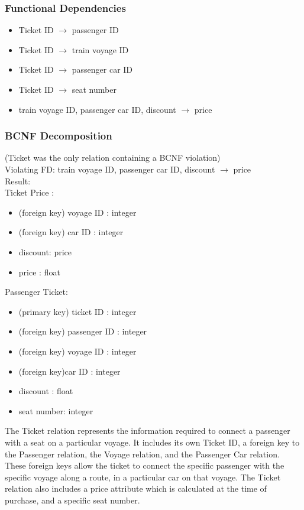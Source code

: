 \documentclass[a4paper]{article}
\begin{document}
\subsubsection*{Functional Dependencies}
\begin{itemize}
\item Ticket ID $\rightarrow$ passenger ID
\item Ticket ID $\rightarrow$ train voyage ID
\item Ticket ID $\rightarrow$ passenger car ID
\item Ticket ID $\rightarrow$ seat number
\item train voyage ID, passenger car ID, discount $\rightarrow$ price
\end{itemize}

\subsubsection*{BCNF Decomposition} 
(Ticket was the only relation containing a BCNF violation)\\
Violating FD: train voyage ID, passenger car ID, discount $\rightarrow$ price\\
Result:\\
Ticket Price :
\begin{itemize}
\item (foreign key) voyage ID : integer
\item (foreign key) car ID : integer
\item discount: price
\item price : float 
\end{itemize}

Passenger Ticket:
\begin{itemize}
\item (primary key) ticket ID : integer
\item (foreign key) passenger ID : integer
\item (foreign key) voyage ID : integer
\item (foreign key)car ID : integer
\item discount : float
\item seat number: integer
\end{itemize}

The Ticket relation represents the information required to connect a passenger with a seat on a particular voyage. It includes its own Ticket ID, a foreign key to the Passenger relation, the Voyage relation, and the Passenger Car relation. These foreign keys allow the ticket to connect the specific passenger with the specific voyage along a route, in a particular car on that voyage. The Ticket relation also includes a price attribute which is calculated at the time of purchase, and a specific seat number.
\end{document}

